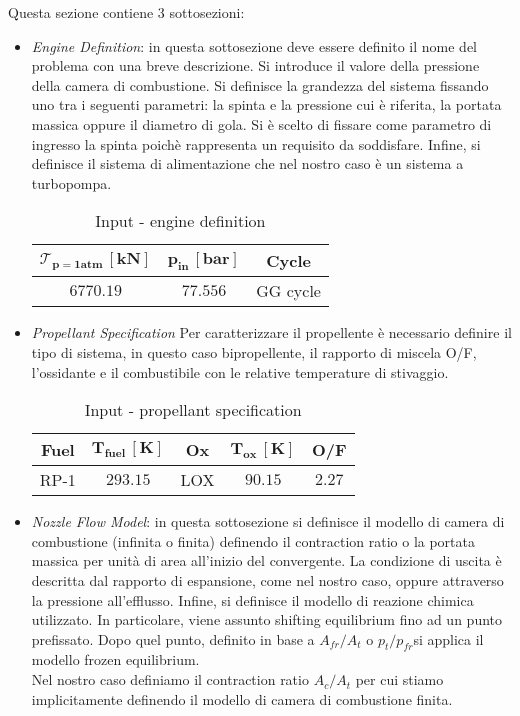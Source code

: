 Questa sezione contiene 3 sottosezioni:
\begin{itemize}
\item \textit{Engine Definition}: in questa sottosezione deve essere definito il nome del problema con una breve descrizione. Si introduce il valore della pressione della camera di combustione. Si definisce la grandezza del sistema fissando uno tra i seguenti parametri: la spinta e la pressione cui è riferita, la portata massica oppure il diametro di gola. Si è scelto di fissare come parametro di ingresso la spinta	 poichè rappresenta un requisito da soddisfare. Infine, si definisce il sistema di alimentazione che nel nostro caso è un sistema a turbopompa.
\begin{table}[H]

\centering
\begin{tabular}{|c|c|c|}
\hline
$\bm{\mathcal{T}_{p=1atm} \, [kN]} $ & $\bm{p_{in} \, [bar]}$ & \textbf{Cycle} \\
\hline
$6770.19$ & $77.556$ & {GG cycle} \\
\hline
\end{tabular}
\caption{Input - engine definition}
\label{table:engine_def}
\end{table}


\item \textit{Propellant Specification} Per caratterizzare il propellente è necessario definire il tipo di sistema, in questo caso bipropellente, il rapporto di miscela O/F, l'ossidante e il combustibile con le relative temperature di stivaggio. 
\begin{table}[H]
\centering
\begin{tabular}{|c|c|c|c|c|}
\hline
\textbf{Fuel} & $\bm{T_{fuel} \, [K]}$ & \textbf{Ox} & $\bm{T_{ox} \, [K]}$  & \textbf{O/F}\\
\hline
{RP-1} & $293.15$ & {LOX} & $90.15$ & $2.27$\\
\hline
\end{tabular}
\caption{Input - propellant specification}
\label{table:prop_spec}
\end{table}
\item \textit{Nozzle Flow Model}: in questa sottosezione si definisce il modello di camera di combustione (infinita o finita) definendo il contraction ratio o la portata massica per unità di area all'inizio del convergente. La  condizione di uscita è descritta dal rapporto di espansione, come nel nostro caso, oppure attraverso la pressione all'efflusso. Infine, si definisce il modello di reazione chimica utilizzato. In particolare, viene assunto shifting equilibrium fino ad un punto prefissato. Dopo quel punto, definito in base a $A_{fr}/A_t$ o $p_t/p_{fr}$si applica il modello frozen equilibrium. \\
Nel nostro caso definiamo il contraction ratio $A_c/A_t$ per cui stiamo implicitamente definendo il modello di camera di combustione finita.


\end{itemize}
